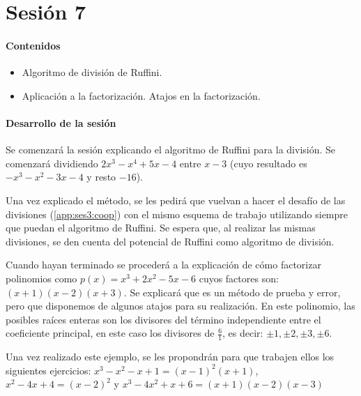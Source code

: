 
\section{Sesión 7}\label{app:ses_comp:7}

\paragraph{Contenidos}
\begin{itemize}
	\item Algoritmo de división de Ruffini.
	\item Aplicación a la factorización.
	\subitem Atajos en la factorización.
\end{itemize}

\paragraph{Desarrollo de la sesión}

Se comenzará la sesión explicando el algoritmo de Ruffini para la división. 
%
Se comenzará dividiendo $2x^3-x^4+5x-4$ entre $x-3$ (cuyo resultado es $-x^3-x^2-3x-4$ y resto $-16$).

Una vez explicado el método, se les pedirá que vuelvan a hacer el desafío de las divisiones (\ref{app:ses3:coop}) con el mismo esquema de trabajo utilizando siempre que puedan el algoritmo de Ruffini.
%
Se espera que, al realizar las mismas divisiones, se den cuenta del potencial de Ruffini como algoritmo de división.

Cuando hayan terminado se procederá a la explicación de cómo factorizar polinomios como $ p(x) = x^3+2x^2-5x-6$ cuyos factores son: $(x+1)(x-2)(x+3)$. 
%
Se explicará que es un método de prueba y error,  pero que disponemos de algunos atajos para su realización. 
%
En este polinomio, las posibles raíces enteras son los divisores del término independiente entre el coeficiente principal, en este caso los divisores de $\frac{6}{1}$, es decir: $\pm1,\pm2,\pm3,\pm6$.

Una vez realizado este ejemplo, se les propondrán para que trabajen ellos los siguientes ejercicios: $x^3-x^2-x+1 = (x-1)^2(x+1)$, $x^2-4x+4 = (x-2)^2$ y $x^3-4x^2+x+6 = (x+1)(x-2)(x-3)$

